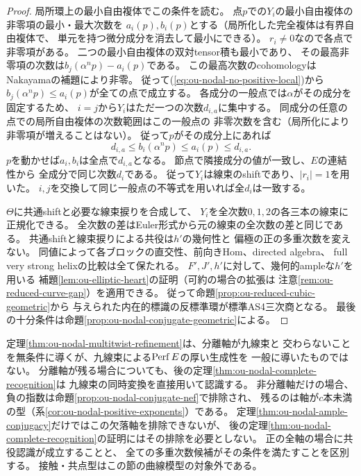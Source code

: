 \begin{proof}
局所環上の最小自由複体でこの条件を読む。
点$p$での$Y_i$の最小自由複体の非零項の最小・最大次数を
$a_i(p),b_i(p)$とする（局所化した完全複体は有界自由複体で、
単元を持つ微分成分を消去して最小にできる）。
$r_i\ne0$なので各点で非零項がある。
二つの最小自由複体の双対tensor積も最小であり、
その最高非零項の次数は$b_j(\alpha^n p)-a_i(p)$である。
この最高次数のcohomologyはNakayamaの補題により非零。
従って(\ref{eq:ou-nodal-no-positive-local})から
$b_j(\alpha^n p)\le a_i(p)$が全ての点で成立する。
各成分の一般点では$\alpha$がその成分を固定するため、
$i=j$から$Y_i$はただ一つの次数$d_{i,a}$に集中する。
同成分の任意の点での局所自由複体の次数範囲はこの一般点の
非零次数を含む（局所化により非零項が増えることはない）。
従って$p$がその成分上にあれば
\[
 d_{i,a}\le b_i(\alpha^n p)\le a_i(p)\le d_{i,a}.
\]
$p$を動かせば$a_i,b_i$は全点で$d_{i,a}$となる。
節点で隣接成分の値が一致し、$E$の連結性から
全成分で同じ次数$d_i$である。
従って$Y_i$は線束のshiftであり、$|r_i|=1$を用いた。
$i,j$を交換して同じ一般点の不等式を用いれば全$d_i$は一致する。

$\Theta$に共通shiftと必要な線束捩りを合成して、
$Y_i$を全次数$0,1,2$の各三本の線束に正規化できる。
全次数の差はEuler形式から元の線束の全次数の差と同じである。
共通shiftと線束捩りによる共役は$h'$の幾何性と
偏極の正の多重次数を変えない。
同値によって各ブロックの直交性、前向きHom、directed algebra、
full very strong helixの比較は全て保たれる。
$F',J',h'$に対して、幾何的ampleな$h'$を用いる
補題\ref{lem:ou-elliptic-heart}の証明（可約の場合の拡張は
注意\ref{rem:ou-reduced-curve-gap}）を適用できる。
従って命題\ref{prop:ou-reduced-cubic-geometric}から
与えられた内在的標識の反標準環が標準AS4三次商となる。
最後の十分条件は命題\ref{prop:ou-nodal-conjugate-geometric}による。
\end{proof}

\begin{remark}
定理\ref{thm:ou-nodal-multitwist-refinement}は、分離軸が九線束と
交わらないことを無条件に導くが、九線束による$\operatorname{Perf} E$の厚い生成性を
一般に導いたものではない。
分離軸が残る場合についても、後の定理\ref{thm:ou-nodal-complete-recognition}は
九線束の同時変換を直接用いて認識する。
非分離軸だけの場合、負の指数は命題\ref{prop:ou-nodal-conjugate-nef}で排除され、
残るのは軸が$c$本未満の型（系\ref{cor:ou-nodal-positive-exponents}）である。
定理\ref{thm:ou-nodal-ample-conjugacy}だけではこの欠落軸を排除できないが、
後の定理\ref{thm:ou-nodal-complete-recognition}の証明にはその排除を必要としない。
正の全軸の場合に共役認識が成立することと、
全ての多重次数候補がその条件を満たすことを区別する。
接触・共点型はこの節の曲線模型の対象外である。
\end{remark}

